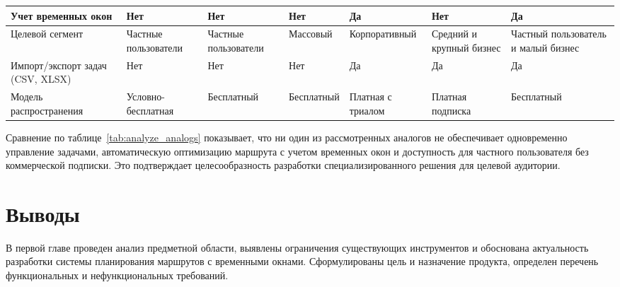 \begin{table}[H]
{\begin{tabular}{|p{2.8cm}|p{1.6cm}|p{1.7cm}|p{1.7cm}|p{1.7cm}|p{2cm}|p{2.1cm}|}
      Учет временных окон
       & Нет                                                                    & Нет & Нет & Да  & Нет & Да \\ \hline
      Целевой сегмент & Частные пользо\-ватели & Частные пользо\-ватели & Массовый & Корпора\-тивный & Средний и крупный бизнес & Частный пользователь и малый бизнес                                                                 \\ \hline
      Импорт/экспорт задач (CSV, XLSX) & Нет & Нет & Нет & Да  & Да  & Да \\ \hline
      Модель распро\-странения
       & Условно-бесплат\-ная
       & Бесплат\-ный
       & Бесплат\-ный
       & Платная с триалом
       & Платная подписка
       & Бесплатный                                                                                          \\ \hline
    \end{tabular}}
\end{table}

Сравнение по таблице~\ref{tab:analyze_analogs} показывает, что ни один из
рассмотренных аналогов не обеспечивает одновременно управление задачами,
автоматическую оптимизацию маршрута с учетом временных окон и доступность
для частного пользователя без коммерческой подписки. Это подтверждает
целесообразность разработки специализированного решения для целевой аудитории.


\section{Выводы}

В первой главе проведен анализ предметной области, выявлены ограничения
существующих инструментов и обоснована актуальность разработки системы
планирования маршрутов с временными окнами. Сформулированы цель и назначение
продукта, определен перечень функциональных и нефункциональных требований.

